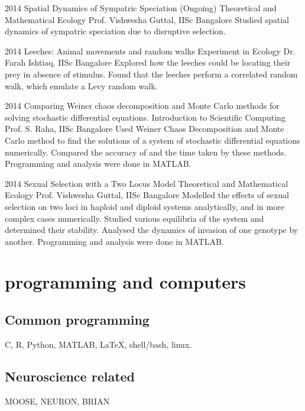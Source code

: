 \documentclass[11pt]{friggeri-cv}%
\begin{document}
\begin{entrylist}
\entry
    {2014}
    {Spatial Dynamics of Sympatric Speciation (Ongoing)}
    {Theoretical and Mathematical Ecology}
    {
    Prof. Vishwesha Guttal, IISc Bangalore}
    {Studied spatial dynamics of sympatric speciation due to disruptive selection. 
    }    
\end{entrylist}
\begin{entrylist}
\entry
    {2014}
    {Leeches:
Animal movements and random walks}
    {Experiment in Ecology}
    {
    Dr. Farah Ishtiaq, IISc Bangalore}
    {Explored how the leeches could be locating their prey in absence of stimulus. Found that the leeches perform a correlated random walk, which emulate a Levy random walk.
    }    
\end{entrylist}
\begin{entrylist}
  \entry
    {2014}
    {Comparing Weiner chaos decomposition and Monte Carlo methods for solving stochastic differential equations.}
    {Introduction to Scientific Computing}
    {
    Prof. S. Raha, IISc Bangalore}
    {Used Weiner Chaos Decomposition and Monte Carlo method to find the solutions of a system of stochastic differential equations numerically. Compared the accuracy  of and the time taken by these methods. Programming and analysis were done in MATLAB.
    }    
\end{entrylist}
\begin{entrylist}
\entry
    {2014}
    {Sexual Selection with a Two Locus Model}
    {Theoretical and Mathematical Ecology}
    {
    Prof. Vishwesha Guttal, IISc Bangalore}
    {Modelled the effects of sexual selection on two loci in haploid and diploid systems analytically, and in more complex cases numerically. Studied various equilibria of the system and determined their stability. Analysed the dynamics of invasion of one genotype by another. Programming and analysis were done in MATLAB.
    }    
\end{entrylist}

\section{programming and computers}
\subsection{Common programming}
C,
 R, 
 Python,
    MATLAB,
{    \lotsoftextfont \LaTeX},
    shell/bash,
    linux.
\subsection{Neuroscience related}
MOOSE, NEURON, BRIAN 
\end{document}
